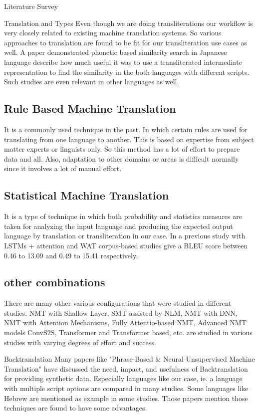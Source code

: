 \begin{chapter}{Literature Survey}

    \begin{section}{Translation and Types}
        Even though we are doing transliterations our workflow is very closely related to existing machine translation systems. So various approaches to translation are found to be fit for our transliteration use cases as well. A paper demonstrated phonetic based similarity search in Japanese language describe how much useful it was to use a transliterated intermediate representation to find the similarity in the both languages with different scripts. Such studies are even relevant in other languages as well.
        \subsection{Rule Based Machine Translation}
        It is a commonly used technique in the past. In which certain rules are used for translating from one language to another. This is based on expertise from subject matter experts or linguists only. So this method has a lot of effort to prepare data and all. Also, adaptation to other domains or areas is difficult normally since it involves a lot of manual effort.
        
        \subsection{Statistical Machine Translation}
        It is a type of technique in which both probability and statistics measures are taken for analyzing the input language and producing the expected output language by translation or transliteration in our case. In a previous study with LSTMs + attention and WAT corpus-based studies give a BLEU score between 0.46 to 13.09 and 0.49 to 15.41 respectively.

        \subsection{other combinations}
        There are many other various configurations that were studied in different studies. NMT with Shallow Layer, SMT assisted by NLM, NMT with DNN, NMT with Attention Mechanisms, Fully Attentio-based NMT, Advanced NMT models ConvS2S, Transformer and Transformer based, etc. are studied in various studies with varying degrees of effort and success.

        
    \end{section}
    \begin{section}{Backtranslation}
   Many papers like "Phrase-Based \& Neural Unsupervised Machine Translation" have discussed the need, impact, and usefulness of Backtranslation for providing synthetic data. Especially languages like our case, ie. a language with multiple script options are compared in many studies. Some languages like Hebrew are mentioned as example in some studies. Those papers mention those techniques are found to have some advantages.
    \end{section}


\end{chapter}
